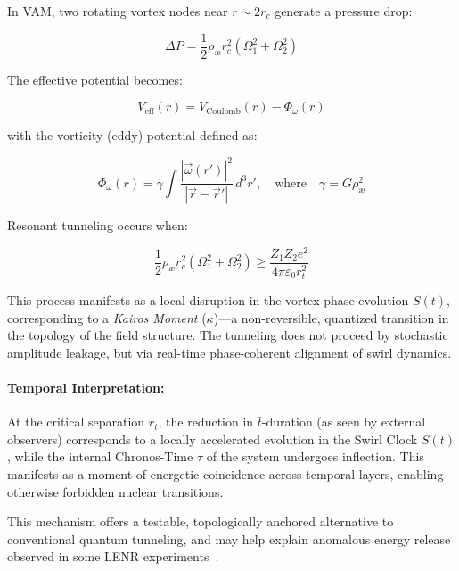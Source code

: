 \documentclass[preprint]{revtex4-2}
\begin{document}
In VAM, two rotating vortex nodes near \( r \sim 2r_c \) generate a pressure drop:

\begin{equation}
    \Delta P = \frac{1}{2} \rho_\text{\ae} r_c^2 (\Omega_1^2 + \Omega_2^2)
\end{equation}

The effective potential becomes:

\begin{equation}
    V_\text{eff}(r) = V_\text{Coulomb}(r) - \Phi_\omega(r)
\end{equation}

with the vorticity (eddy) potential defined as:

\begin{equation}
    \Phi_\omega(r) = \gamma \int \frac{|\vec{\omega}(r')|^2}{|\vec{r} - \vec{r}'|} \, d^3r',
    \quad \text{where} \quad \gamma = G \rho_\text{\ae}^2
\end{equation}

Resonant tunneling occurs when:

\begin{equation}
    \frac{1}{2} \rho_\text{\ae} r_c^2 (\Omega_1^2 + \Omega_2^2) \geq \frac{Z_1 Z_2 e^2}{4\pi \varepsilon_0 r_t^2}
\end{equation}

This process manifests as a local disruption in the vortex-phase evolution \(S(t)\), corresponding to a \emph{Kairos Moment} (\(\kappa\))—a non-reversible, quantized transition in the topology of the field structure. The tunneling does not proceed by stochastic amplitude leakage, but via real-time phase-coherent alignment of swirl dynamics.

\paragraph{Temporal Interpretation:}

At the critical separation \(r_t\), the reduction in \(\bar{t}\)-duration (as seen by external observers) corresponds to a locally accelerated evolution in the Swirl Clock \(S(t)\), while the internal Chronos-Time \(\tau\) of the system undergoes inflection. This manifests as a moment of energetic coincidence across temporal layers, enabling otherwise forbidden nuclear transitions.

This mechanism offers a testable, topologically anchored alternative to conventional quantum tunneling, and may help explain anomalous energy release observed in some LENR experiments~\cite{Storms2021}.
\end{document}
